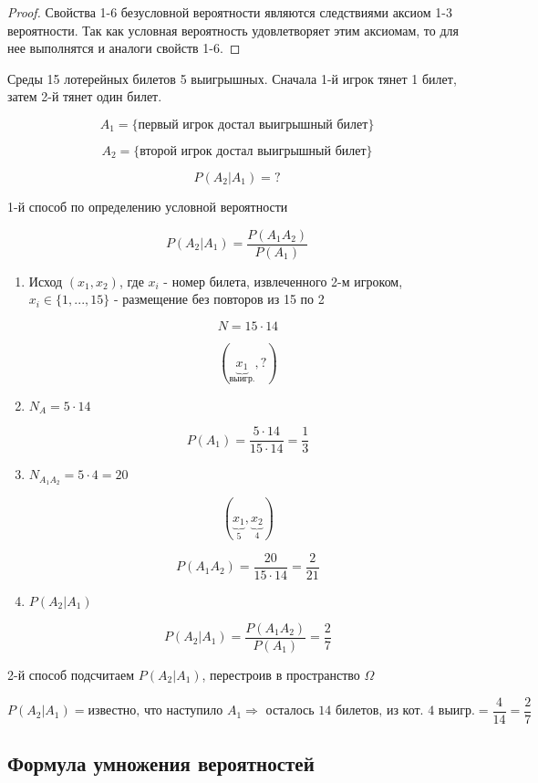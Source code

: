 \documentclass[a4paper, 14pt]{report}
\begin{document}
\begin{proof}
    Свойства 1-6 безусловной вероятности являются следствиями аксиом 1-3 вероятности. Так как условная вероятность удовлетворяет этим аксиомам, то для нее выполнятся и аналоги свойств 1-6.
\end{proof}

Среды 15 лотерейных билетов 5 выигрышных. Сначала 1-й игрок тянет 1 билет, затем 2-й тянет один билет.

$$
A_1 = \{ \text{первый игрок достал выигрышный билет} \}
$$

$$
A_2 = \{ \text{второй игрок достал выигрышный билет} \}
$$

$$
P(A_2|A_1) = ?
$$

1-й способ по определению условной вероятности

$$
P(A_2|A_1) = \frac{P(A_1A_2)}{P(A_1)}
$$

\begin{enumerate}
    \item Исход $(x_1,x_2)$, где $x_i$ - номер билета, извлеченного 2-м игроком, $x_i \in \{ 1, ... , 15 \}$ - размещение без повторов из 15 по 2

        $$
        N = 15 \cdot 14
        $$

        $$
        (\underbrace{x_1}_{\text{выигр.}}, ?)
        $$

    \item $N_A = 5 \cdot 14$

        $$
        P(A_1) = \frac{5 \cdot 14}{15 \cdot 14} = \frac{1}{3}
        $$

    \item $N_{A_1A_2} = 5 \cdot 4 = 20$

        $$
        (\underbrace{x_1}_5, \underbrace{x_2}_4)
        $$

        $$
        P(A_1A_2) = \frac{20}{15 \cdot 14} = \frac{2}{21}
        $$

    \item $P(A_2|A_1)$

        $$
        P(A_2 | A_1) = \frac{P(A_1A_2)}{P(A_1)} = \frac{2}{7}
        $$
\end{enumerate}

2-й способ подсчитаем $P(A_2|A_1)$, перестроив в пространство $\Omega$

$$
P(A_2|A_1) = \text{известно, что наступило } A_1 \Rightarrow \text{ осталось 14 билетов, из кот. 4 выигр.} = \frac{4}{14} = \frac{2}{7}
$$

\subsection{Формула умножения вероятностей}
\end{document}
